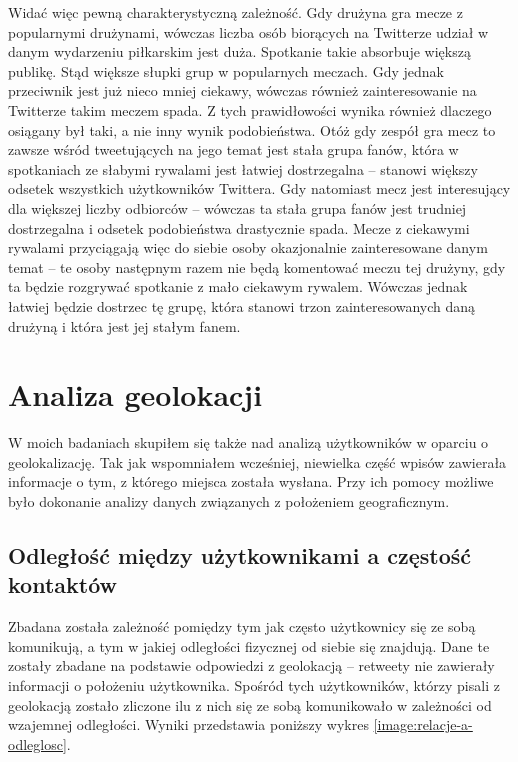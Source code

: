 Widać więc pewną charakterystyczną zależność. Gdy drużyna gra mecze z popularnymi
drużynami, wówczas liczba osób biorących na Twitterze udział w danym wydarzeniu
piłkarskim jest duża. Spotkanie takie absorbuje większą publikę. Stąd
większe słupki grup w popularnych meczach. Gdy jednak przeciwnik jest już nieco
mniej ciekawy, wówczas również zainteresowanie na Twitterze takim meczem spada.
Z tych prawidłowości wynika również dlaczego osiągany był taki, a nie inny
wynik podobieństwa. Otóż gdy zespół gra mecz to zawsze
wśród tweetujących na jego temat jest stała grupa fanów, która w spotkaniach
ze słabymi rywalami jest łatwiej dostrzegalna -- stanowi większy odsetek
wszystkich użytkowników Twittera. Gdy natomiast mecz jest interesujący
dla większej liczby odbiorców -- wówczas ta stała grupa fanów jest trudniej
dostrzegalna i odsetek podobieństwa drastycznie spada.
Mecze z ciekawymi rywalami przyciągają więc do siebie osoby okazjonalnie zainteresowane
danym temat -- te osoby następnym razem nie będą komentować meczu tej drużyny,
gdy ta będzie rozgrywać spotkanie z mało ciekawym rywalem. 
Wówczas jednak łatwiej będzie dostrzec tę grupę, która stanowi trzon zainteresowanych
daną drużyną i która jest jej stałym fanem.














\section{Analiza geolokacji}
\label{section:analizageograficzna}

W moich badaniach skupiłem się także nad analizą użytkowników w oparciu 
o geolokalizację. Tak jak wspomniałem wcześniej, niewielka część wpisów
zawierała informacje o tym, z którego miejsca została wysłana.
Przy ich pomocy możliwe było dokonanie analizy danych związanych z położeniem
geograficznym.

\subsection{Odległość między użytkownikami a częstość kontaktów}
Zbadana została zależność pomiędzy tym jak często użytkownicy się ze sobą
komunikują, a tym w jakiej odległości fizycznej od siebie się znajdują.
Dane te zostały zbadane na podstawie odpowiedzi z geolokacją -- retweety
nie zawierały informacji o położeniu użytkownika.
Spośród tych użytkowników, którzy pisali z geolokacją zostało zliczone
ilu z nich się ze sobą komunikowało w zależności od wzajemnej odległości.
Wyniki przedstawia poniższy wykres \ref{image:relacje-a-odleglosc}.

